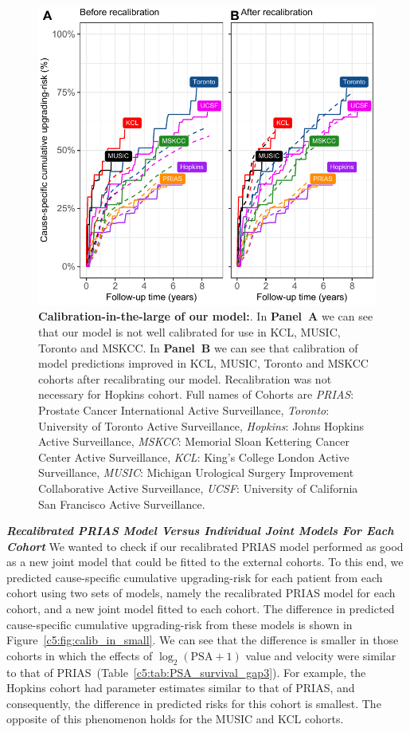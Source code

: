 \begin{subappendices}
\begin{figure}
\centerline{\includegraphics{contents/c5/images/c5_fig_app2.pdf}}
\caption{\textbf{Calibration-in-the-large of our model:}. In \textbf{Panel~A} we can see that our model is not well calibrated for use in KCL, MUSIC, Toronto and MSKCC. In \textbf{Panel~B} we can see that calibration of model predictions improved in KCL, MUSIC, Toronto and MSKCC cohorts after recalibrating our model. Recalibration was not necessary for Hopkins cohort. Full names of Cohorts are \textit{PRIAS}: Prostate Cancer International Active Surveillance, \textit{Toronto}: University of Toronto Active Surveillance, \textit{Hopkins}: Johns Hopkins Active Surveillance, \textit{MSKCC}: Memorial Sloan Kettering Cancer Center Active Surveillance, \textit{KCL}: King's College London Active Surveillance, \textit{MUSIC}: Michigan Urological Surgery Improvement Collaborative Active Surveillance, \textit{UCSF}: University of California San Francisco Active Surveillance.}
\label{c5:fig:calib_before_after}
\end{figure}


\textbf{\textit{Recalibrated PRIAS Model Versus Individual Joint Models For Each Cohort}}
We wanted to check if our recalibrated PRIAS model performed as good as a new joint model that could be fitted to the external cohorts. To this end, we predicted cause-specific cumulative upgrading-risk for each patient from each cohort using two sets of models, namely the recalibrated PRIAS model for each cohort, and a new joint model fitted to each cohort. The difference in predicted cause-specific cumulative upgrading-risk from these models is shown in Figure~\ref{c5:fig:calib_in_small}. We can see that the difference is smaller in those cohorts in which the effects of $\log_2 (\mbox{PSA} + 1)$ value and velocity were similar to that of PRIAS~(Table~\ref{c5:tab:PSA_survival_gap3}). For example, the Hopkins cohort had parameter estimates similar to that of PRIAS, and consequently, the difference in predicted risks for this cohort is smallest. The opposite of this phenomenon holds for the MUSIC and KCL cohorts.
 

\end{subappendices}
